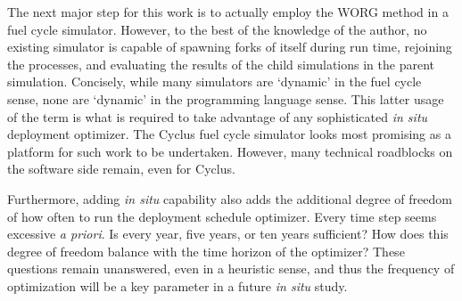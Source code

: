 The next major step for this work is to actually employ the WORG method in 
a fuel cycle simulator.  However, to the best of the knowledge of the 
author, no existing simulator is capable of spawning forks of itself 
during run time, rejoining the processes, and evaluating the results of the 
child simulations in the parent simulation. Concisely, while many simulators 
are 
`dynamic' in the fuel cycle sense, none are `dynamic' in the programming
language sense. This latter usage of the term is what is required to 
take advantage of any sophisticated \emph{in situ} deployment optimizer.
The Cyclus fuel cycle simulator looks most promising as a platform
for such work to be undertaken. However, many technical roadblocks 
on the software side remain, even for Cyclus.

Furthermore, adding \emph{in situ} capability also adds the additional 
degree of freedom of how often to run the deployment schedule optimizer.
Every time step seems excessive \emph{a priori}. Is every year, five years,
or ten years sufficient? How does this degree of freedom balance with the
time horizon of the optimizer? These questions remain unanswered, even 
in a heuristic sense, and thus the frequency of optimization will be a key 
parameter in a future \emph{in situ} study.
